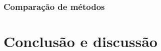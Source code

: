 \documentclass[10pt, conference, compsocconf]{IEEEtran}
\begin{document}
\lipsum[4]


\subsubsection{Comparação de métodos}

\lipsum[5]


\section{Conclusão e discussão}
\label{sec:cnd}

\lipsum[4]
\cite{boser1992training}

\small
\begin{spacing}{0.92}


\end{spacing}
\end{document}
